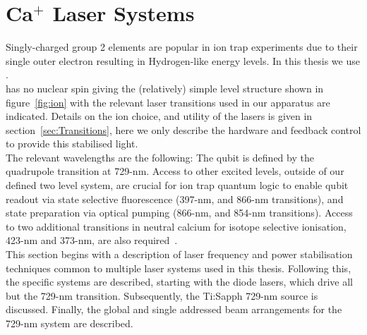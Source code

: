 \section{Ca$^+$ Laser Systems}	
\label{sec:Laser systems}

    Singly-charged group 2 elements are popular in ion trap
    experiments due to their single outer electron resulting in Hydrogen-like
    energy levels. In this thesis we use \ca.\\
    \ca has
    no nuclear spin giving the
    (relatively) simple level structure shown in figure~\ref{fig:ion} with the relevant laser transitions used in our apparatus are indicated. Details on the ion choice, and utility of the lasers is given in section~\ref{sec:Transitions}, here we only describe the hardware and feedback control to provide this stabilised light.\\
    The relevant wavelengths are the following:
    The qubit is defined by the quadrupole transition at 729-nm. Access to other excited levels, outside of our defined two level system, are crucial for ion trap quantum logic to enable qubit readout via state selective fluorescence (397-nm, and 866-nm transitions), and state preparation via optical pumping (866-nm, and 854-nm transitions). Access to two additional transitions in neutral calcium for isotope selective ionisation, 423-nm and 373-nm, are also required~\cite{lucas_isotope-selective_2004}.\\
    This section begins with a description of laser frequency and power stabilisation techniques common to multiple laser systems used in this thesis. Following this, the specific systems are described, starting with 
    the diode lasers, which drive all but the 729-nm transition. Subsequently, the Ti:Sapph 729-nm source is discussed. Finally, the global and single addressed beam arrangements for the 729-nm system are described.\\

